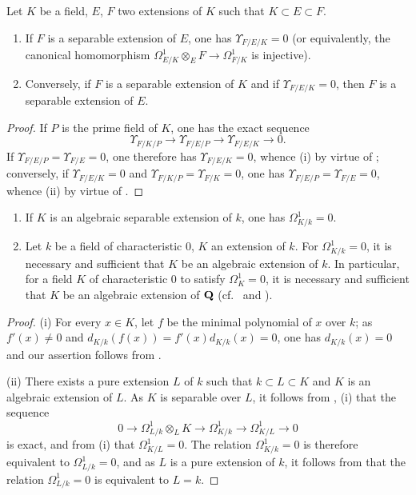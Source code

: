 \begin{corollary}[20.6.19]
\label{0.20.6.19}
Let $K$ be a field, $E$, $F$ two extensions of $K$ such that $K\subset E\subset F$.
\begin{enumerate}
  \item[\rm(i)] If $F$ is a separable extension of $E$, one has $\Upsilon_{F/E/K}=0$ \textup{(}or equivalently, the canonical homomorphism $\Omega^1_{E/K}\otimes_E F\to\Omega^1_{F/K}$ is injective\textup{)}.
  \item[\rm(ii)] Conversely, if $F$ is a separable extension of $K$ and if $\Upsilon_{F/E/K}=0$, then $F$ is a separable extension of $E$.
\end{enumerate}
\end{corollary}

\begin{proof}
If $P$ is the prime field of $K$, one has the exact sequence 
\[
  \Upsilon_{F/K/P}\to\Upsilon_{F/E/P}\to\Upsilon_{F/E/K}\to 0.
\]
If $\Upsilon_{F/E/P}=\Upsilon_{F/E}=0$, one therefore has $\Upsilon_{F/E/K}=0$, whence (i) by virtue of ; conversely, if $\Upsilon_{F/E/K}=0$ and $\Upsilon_{F/K/P}=\Upsilon_{F/K}=0$, one has $\Upsilon_{F/E/P}=\Upsilon_{F/E}=0$, whence (ii) by virtue of .
\end{proof}

\begin{corollary}[20.6.20]
\label{0.20.6.20}
\begin{enumerate}
  \item[\rm(i)] If $K$ is an algebraic separable extension of $k$, one has $\Omega^1_{K/k}=0$.
  \item[\rm(ii)] Let $k$ be a field of characteristic $0$, $K$ an extension of $k$.
  For $\Omega^1_{K/k}=0$, it is necessary and sufficient that $K$ be an algebraic extension of $k$.
  In particular, for a field $K$ of characteristic $0$ to satisfy $\Omega^1_K=0$, it is necessary and sufficient that $K$ be an algebraic extension of $\mathbf{Q}$ (cf.\  and ).
\end{enumerate}
\end{corollary}

\begin{proof}
(i) For every $x\in K$, let $f$ be the minimal polynomial of $x$ over $k$; as $f'(x)\neq 0$ and $d_{K/k}(f(x))=f'(x)d_{K/k}(x)=0$, one has $d_{K/k}(x)=0$ and our assertion follows from .

(ii) There exists a pure extension $L$ of $k$ such that $k\subset L\subset K$ and $K$ is an algebraic extension of $L$.
As $K$ is separable over $L$, it follows from , (i) that the sequence
\[
  0\to\Omega^1_{L/k}\otimes_L K\to\Omega^1_{K/k}\to\Omega^1_{K/L}\to 0
\]
is exact, and from (i) that $\Omega^1_{K/L}=0$.
The relation $\Omega^1_{K/k}=0$ is therefore equivalent to $\Omega^1_{L/k}=0$, and as $L$ is a pure extension of $k$, it follows from  that the relation $\Omega^1_{L/k}=0$ is equivalent to $L=k$.
\end{proof}


